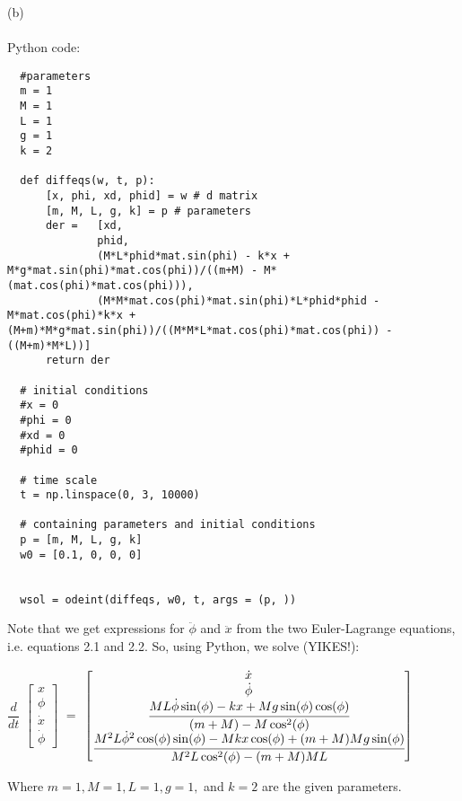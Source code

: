 \documentclass[11pt]{article}
\begin{document}
\begin{enumerate}
(b)
\\ \\
Python code:
\begin{lstlisting}
  #parameters
  m = 1
  M = 1
  L = 1
  g = 1
  k = 2

  def diffeqs(w, t, p):
      [x, phi, xd, phid] = w # d matrix
      [m, M, L, g, k] = p # parameters
      der =   [xd, 
              phid, 
              (M*L*phid*mat.sin(phi) - k*x + M*g*mat.sin(phi)*mat.cos(phi))/((m+M) - M*(mat.cos(phi)*mat.cos(phi))),
              (M*M*mat.cos(phi)*mat.sin(phi)*L*phid*phid - M*mat.cos(phi)*k*x + (M+m)*M*g*mat.sin(phi))/((M*M*L*mat.cos(phi)*mat.cos(phi)) - ((M+m)*M*L))]
      return der

  # initial conditions
  #x = 0
  #phi = 0
  #xd = 0 
  #phid = 0

  # time scale
  t = np.linspace(0, 3, 10000)

  # containing parameters and initial conditions
  p = [m, M, L, g, k]
  w0 = [0.1, 0, 0, 0]


  wsol = odeint(diffeqs, w0, t, args = (p, ))
\end{lstlisting}

Note that we get expressions for $\ddot{\phi}$ and $\ddot{x}$ from the two Euler-Lagrange equations, i.e. equations 2.1 and 2.2. So, using Python, we solve (YIKES!):
\begin{center}
  $\dfrac{d}{dt}$
$\begin{bmatrix}
  x \\
  \phi \\
  \dot{x} \\
  \dot{\phi} 
\end{bmatrix}$
$ = $
$\begin{bmatrix}
  \dot{x} \\
  \dot{\phi} \\
  \cfrac{ML\dot{\phi}\sin(\phi) - kx + Mg\sin(\phi)\cos(\phi)}{(m+M) - M\cos^2(\phi)} \\
  \cfrac{M^2L\dot{\phi}^2\cos(\phi)\sin(\phi) - Mkx\cos(\phi) + (m+M)Mg\sin(\phi)}{M^2 L \cos^2(\phi) - (m+M)ML}
\end{bmatrix}$
\end{center}

Where $m = 1, M = 1, L = 1, g = 1,$ and $k = 2$ are the given parameters.

\begin{center}
\end{center}


\end{enumerate}
\end{document}
